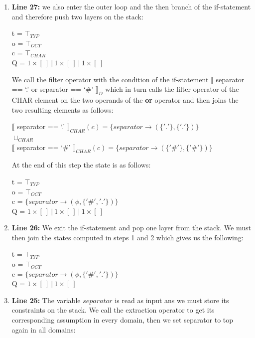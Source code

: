 \documentclass[10pt]{report}
\begin{document}
\begin{enumerate}
	\item \textbf{Line 27:} we also enter the outer loop and the then branch of the if-statement and therefore push two layers on the stack:
	\begin{center}
		t = $ \top_{TYP} $ \\
		o = $ \top_{OCT}$ \\
		c = $ \top_{CHAR} $ \\
		Q = $ 1 \times [\ ]\ \vert\ 1 \times [\ ]\ \vert\ 1 \times [\ ] $
	\end{center}
	We call the filter operator with the condition of the if-statement $ \llbracket $ separator == `.' or separator == `\#' $ \rrbracket_{D} $ which in turn calls the filter operator of the CHAR element on the two operands of the \textbf{or} operator and then joins the two resulting elements as follows:
	\begin{center}
		$ \llbracket$ separator == `.' $ \rrbracket_{CHAR}(c) = \lbrace separator \rightarrow (\lbrace '.' \rbrace, \lbrace '.' \rbrace) \rbrace $ \\
		$ \sqcup_{CHAR} $ \\
		$ \llbracket$ separator == `\#' $ \rrbracket_{CHAR}(c) = \lbrace separator \rightarrow ( \lbrace '\#' \rbrace, \lbrace '\#' \rbrace) \rbrace $
	\end{center}
	At the end of this step the state is as follows: 
	\begin{center}
		t = $ \top_{TYP} $ \\
		o = $ \top_{OCT}$ \\
		c = 	$ \lbrace separator \rightarrow (\phi, \lbrace '\#', '.' \rbrace) \rbrace $ \\
		Q = $ 1 \times [\ ]\ \vert\ 1 \times [\ ]\ \vert\ 1 \times [\ ] $
	\end{center}
	\item \textbf{Line 26:} We exit the if-statement and pop one layer from the stack. We must then join the states computed in steps 1 and 2 which gives us the following: 
	\begin{center}
		t = $ \top_{TYP} $ \\
		o = $ \top_{OCT}$ \\
		c = 	$ \lbrace separator \rightarrow (\phi, \lbrace '\#', '.' \rbrace) \rbrace $ \\
		Q = $ 1 \times [\ ]\ \vert\ 1 \times [\ ]$
	\end{center}
	\item \textbf{Line 25:} The variable $ separator $ is read as input ans we must store its constraints on the stack. We call the extraction operator to get its corresponding assumption in every domain, then we set separator to top again in all domains: 

\end{enumerate}
\end{document}
